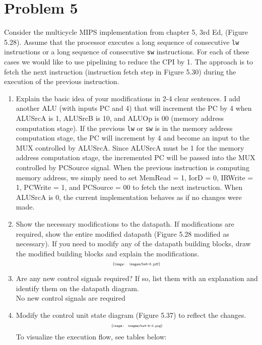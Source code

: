 \documentclass[10pt,letterpaper]{article}
\begin{document}

\section{Problem 5}
Consider the multicycle MIPS implementation from chapter 5, 3rd Ed, (Figure 5.28). Assume that the processor executes a long sequence of consecutive \texttt{lw} instructions or a long sequence of consecutive \texttt{sw} instructions. For each of these cases we would like to use pipelining to reduce the CPI by 1. The approach is to fetch the next instruction (instruction fetch step in Figure 5.30) during the execution of the previous instruction.
\begin{enumerate}[label=\Alph*)]
\item Explain the basic idea of your modifications in 2-4 clear sentences.
I add another ALU (with inputs PC and 4) that will increment the PC by 4 when ALUSrcA is 1, ALUSrcB is 10, and ALUOp is 00 (memory address computation stage). If the previous \texttt{lw} or \texttt{sw} is in the memory address computation stage, the PC will increment by 4 and become an input to the MUX controlled by ALUSrcA. Since ALUSrcA must be 1 for the memory address computation stage, the incremented PC will be passed into the MUX controlled by PCSource signal. When the previous instruction is computing memory address, we simply need to set MemRead = 1, IorD = 0, IRWrite = 1, PCWrite = 1, and PCSource = 00 to fetch the next instruction. When ALUSrcA is 0, the current implementation behaves as if no changes were made.  
\item Show the necessary modifications to the datapath. If modifications are required, show the entire modified datapath (Figure 5.28 modified as necessary). If you need to modify any of the datapath building blocks, draw the modified building blocks and explain the modifications.
\[\scalebox{0.5}{\texttt{[image: images/hw4-5.pdf]}}\]
\item Are any new control signals required? If so, list them with an explanation and identify them on the datapath diagram.\\
No new control signals are required
\item Modify the control unit state diagram (Figure 5.37) to reflect the changes.
\[\scalebox{0.50}{\texttt{[image: images/hw4-5-2.png]}}\]
To visualize the execution flow, see tables below:
\begin{center}
\begin{tabular} { |c|c|c|c|c|c|c|c|c|c|c|c| }

\end{tabular}
\end{center}
\end{enumerate}
\end{document}
